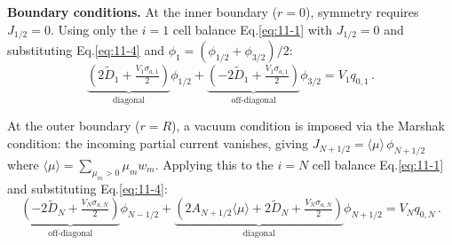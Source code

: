 \begin{mybox}
  \textbf{Boundary conditions.} At the inner boundary ($r=0$), symmetry requires $J_{1/2}=0$. Using only the $i=1$ cell balance Eq.\eqref{eq:11-1} with $J_{1/2}=0$ and substituting Eq.\eqref{eq:11-4} and $\phi_1 = (\phi_{1/2}+\phi_{3/2})/2$:
  \begin{equation}
    \underbrace{\left(2\widetilde{D}_1 + \tfrac{V_1\sigma_{a,1}}{2}\right)}_{\text{diagonal}}\phi_{1/2}
    + \underbrace{\left(-2\widetilde{D}_1 + \tfrac{V_1\sigma_{a,1}}{2}\right)}_{\text{off-diagonal}}\phi_{3/2}
    = V_1 q_{0,1}\,.\label{eq:11-bc-inner}
  \end{equation}

  At the outer boundary ($r=R$), a vacuum condition is imposed via the Marshak condition: the incoming partial current vanishes, giving $J_{N+1/2} = \langle\mu\rangle\,\phi_{N+1/2}$ where $\langle\mu\rangle = \sum_{\mu_m>0}\mu_m w_m$. Applying this to the $i=N$ cell balance Eq.\eqref{eq:11-1} and substituting Eq.\eqref{eq:11-4}:
  \begin{equation}
    \underbrace{\left(-2\widetilde{D}_N + \tfrac{V_N\sigma_{a,N}}{2}\right)}_{\text{off-diagonal}}\phi_{N-1/2}
    + \underbrace{\left(2A_{N+1/2}\langle\mu\rangle + 2\widetilde{D}_N + \tfrac{V_N\sigma_{a,N}}{2}\right)}_{\text{diagonal}}\phi_{N+1/2}
    = V_N q_{0,N}\,.\label{eq:11-bc-outer}
  \end{equation}

\end{mybox}

